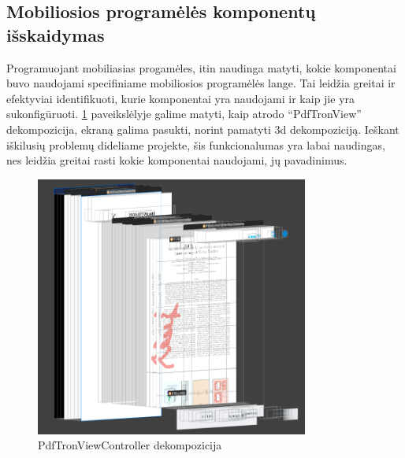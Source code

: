 \subsection{Mobiliosios programėlės komponentų išskaidymas}

Programuojant mobiliasias progamėles, itin naudinga matyti, kokie komponentai buvo naudojami specifiniame mobiliosios programėlės lange. Tai leidžia greitai ir efektyviai identifikuoti, kurie komponentai yra naudojami ir kaip jie yra sukonfigūruoti.
\ref{img:pdfViewController} paveikslėlyje galime matyti, kaip atrodo \enquote{PdfTronView} dekompozicija, ekraną galima pasukti, norint pamatyti 3d dekompoziciją. Ieškant iškilusių problemų dideliame projekte, šis funkcionalumas yra labai naudingas, nes leidžia greitai rasti kokie komponentai naudojami, jų pavadinimus. 
\begin{figure}[htbp!]
    \centering
    \includegraphics[width=0.8\textwidth]{Images/SideViewPdfViewController.png}
    \caption{PdfTronViewController dekompozicija}
    \label{img:pdfViewController}
\end{figure}
\newpage
